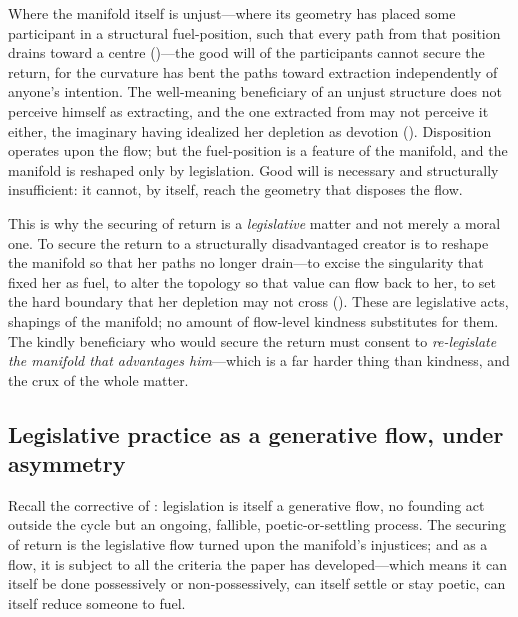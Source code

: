 \begin{claim}
Where the manifold itself is unjust---where its geometry has placed some participant in a structural fuel-position, such that every path from that position drains toward a centre ()---the good will of the participants cannot secure the return, for the curvature has bent the paths toward extraction independently of anyone's intention. The well-meaning beneficiary of an unjust structure does not perceive himself as extracting, and the one extracted from may not perceive it either, the imaginary having idealized her depletion as devotion (). Disposition operates upon the flow; but the fuel-position is a feature of the manifold, and the manifold is reshaped only by legislation. Good will is necessary and structurally insufficient: it cannot, by itself, reach the geometry that disposes the flow.
\end{claim}

This is why the securing of return is a \emph{legislative} matter and not merely a moral one. To secure the return to a structurally disadvantaged creator is to reshape the manifold so that her paths no longer drain---to excise the singularity that fixed her as fuel, to alter the topology so that value can flow back to her, to set the hard boundary that her depletion may not cross (). These are legislative acts, shapings of the manifold; no amount of flow-level kindness substitutes for them. The kindly beneficiary who would secure the return must consent to \emph{re-legislate the manifold that advantages him}---which is a far harder thing than kindness, and the crux of the whole matter.

\subsection{Legislative practice as a generative flow, under asymmetry}
\label{p09:sec:legislative-practice}

Recall the corrective of : legislation is itself a generative flow, no founding act outside the cycle but an ongoing, fallible, poetic-or-settling process. The securing of return is the legislative flow turned upon the manifold's injustices; and as a flow, it is subject to all the criteria the paper has developed---which means it can itself be done possessively or non-possessively, can itself settle or stay poetic, can itself reduce someone to fuel.

